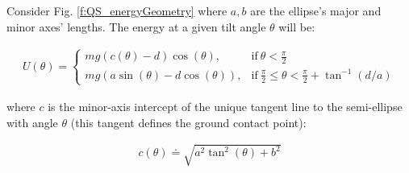 \documentclass[letterpaper, 10 pt, conference]{ieeeconf}
\begin{document}
Consider Fig. \ref{f:QS_energyGeometry} where $a,b$ are the ellipse's major and minor axes' lengths.
The energy at a given tilt angle $\theta$ will be:

\begin{align}
  U(\theta) =
    \begin{cases}
      mg (c(\theta)-d) \cos(\theta), & \text{if}\ \theta < \frac{\pi}{2} \\
      mg (a \sin(\theta) - d \cos(\theta) ), & \text{if}\ \frac{\pi}{2} \leq \theta < \frac{\pi}{2} + \tan^{-1}(d/a)
    \end{cases}
  \label{eq:QSEnergy}
\end{align}

where $c$ is the minor-axis intercept of the unique tangent line to the semi-ellipse with angle $\theta$ (this tangent defines the ground contact point):

\begin{align}
  c(\theta) \doteq \sqrt{a^2 \tan^2(\theta) + b^2}
\end{align}
\end{document}
